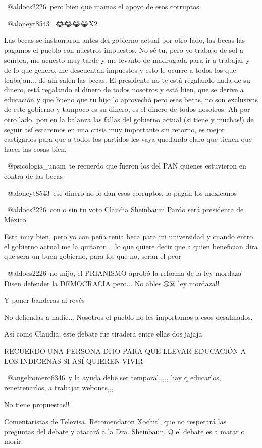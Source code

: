 ​ @aldocs2226 pero bien que mamas el apoyo de esos corruptos

​ @aloneyt8543  😂😂😂😂X2

Las becas se instauraron antes del gobierno actual por otro lado, las becas las pagamos el pueblo con nuestros impuestos. No sé tu, pero yo trabajo de sol a sombra, me acuesto muy tarde y me levanto de madrugada para ir a trabajar y de lo que genero, me descuentan impuestos y esto le ocurre a todos los que trabajan... de ahí salen las becas. El presidente no te está regalando nada de su dinero, está regalando el dinero de todos nosotros y está bien, que se derive a educación y que bueno que tu hijo lo aprovechó pero esas becas, no son exclusivas de este gobierno y tampoco es su dinero, es el dinero de todos nosotros. 
Ah por otro lado, pon en la balanza las fallas del gobierno actual (si tiene y muchas!) de seguir así estaremos en una crisis muy importante sin retorno, es mejor castigarlos para que a todos los partidos les vaya quedando claro que tienen que hacer las cosas bien.

 @psicologia_unam te recuerdo que fueron los del PAN quienes estuvieron en contra de las becas

​ @aloneyt8543 ese dinero no lo dan esos corruptos, lo pagan los mexicanos

​ @aldocs2226 con o sin tu voto Claudia Sheinbaum Pardo será presidenta de México

Esta muy bien, pero yo con peña tenia beca para mi universidad y cuando entro el gobierno actual me la quitaron... lo que quiere decir que a quien benefician dira que sera un buen gobierno, para los que no, seran el peor

​ @aldocs2226 no mijo, el PRIANISMO aprobó la reforma de la ley mordaza Disen defender la DEMOCRACIA pero... No ables 🤐☠️ ley mordaza!!

Y poner banderas al revés

No defiendas a nadie... Nosotros el pueblo no les importamos a esos desalmados.

Así como Claudia, este debate fue tiradera entre ellas dos jajaja

RECUERDO UNA PERSONA DIJO PARA QUE LLEVAR EDUCACIÓN A LOS INDIGENAS SI ASÍ  QUIEREN VIVIR

​ @angelromero6346 y la ayuda debe ser temporal,,,,, hay q educarlos, renetrenarlos, a trabajar webones,,,

No tiene propuestas!!

Comentaristas de Televisa. Recomendaron Xochitl, que no respetará las preguntas del debate y atacará a la Dra. Sheinbaun. Q el debate  es a matar o morir.

